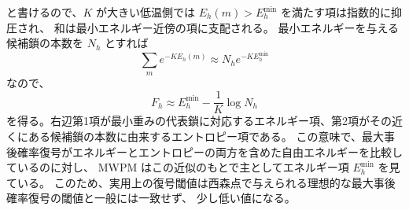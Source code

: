 \documentclass[../master.tex]{subfiles}
\begin{document}
と書けるので、\(K\) が大きい低温側では \(E_h(m)>E_h^{\min}\) を満たす項は指数的に抑圧され、
和は最小エネルギー近傍の項に支配される。
最小エネルギーを与える候補鎖の本数を \(N_h\) とすれば
\begin{equation}
    \sum_m e^{-K E_h(m)}\approx N_h e^{-K E_h^{\min}}
\end{equation}
なので、
\begin{equation}
    F_h\approx E_h^{\min}-\frac{1}{K}\log N_h
\end{equation}
を得る。右辺第1項が最小重みの代表鎖に対応するエネルギー項、第2項がその近くにある候補鎖の本数に由来するエントロピー項である。
この意味で、最大事後確率復号がエネルギーとエントロピーの両方を含めた自由エネルギーを比較しているのに対し、
MWPM はこの近似のもとで主としてエネルギー項 \(E_h^{\min}\) を見ている。
このため、実用上の復号閾値は西森点で与えられる理想的な最大事後確率復号の閾値と一般には一致せず、
少し低い値になる。
\end{document}
